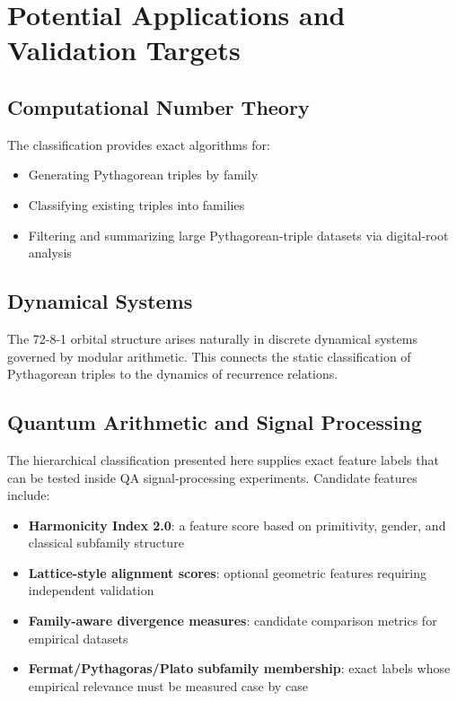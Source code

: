 \documentclass[12pt]{article}
\begin{document}
\section{Potential Applications and Validation Targets}

\subsection{Computational Number Theory}

The classification provides exact algorithms for:
\begin{itemize}
\item Generating Pythagorean triples by family
\item Classifying existing triples into families
\item Filtering and summarizing large Pythagorean-triple datasets via digital-root analysis
\end{itemize}

\subsection{Dynamical Systems}

The 72-8-1 orbital structure arises naturally in discrete dynamical systems governed by modular arithmetic. This connects the static classification of Pythagorean triples to the dynamics of recurrence relations.

\subsection{Quantum Arithmetic and Signal Processing}

The hierarchical classification presented here supplies exact feature labels that can be tested inside QA signal-processing experiments. Candidate features include:

\begin{itemize}
\item \textbf{Harmonicity Index 2.0}: a feature score based on primitivity, gender, and classical subfamily structure
\item \textbf{Lattice-style alignment scores}: optional geometric features requiring independent validation
\item \textbf{Family-aware divergence measures}: candidate comparison metrics for empirical datasets
\item \textbf{Fermat/Pythagoras/Plato subfamily membership}: exact labels whose empirical relevance must be measured case by case
\end{itemize}
\end{document}
